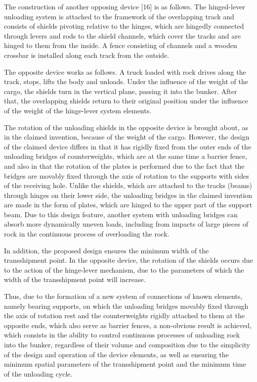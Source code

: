 \begin{multicols}{2}
The construction of another opposing device {[}16{]} is as follows. The
hinged-lever unloading system is attached to the framework of the
overlapping track and consists of shields pivoting relative to the
hinges, which are hingedly connected through levers and rods to the
shield channels, which cover the tracks and are hinged to them from the
inside. A fence consisting of channels and a wooden crossbar is
installed along each track from the outside.

The opposite device works as follows. A truck loaded with rock drives
along the track, stops, lifts the body and unloads. Under the influence
of the weight of the cargo, the shields turn in the vertical plane,
passing it into the bunker. After that, the overlapping shields return
to their original position under the influence of the weight of the
hinge-lever system elements.

The rotation of the unloading shields in the opposite device is brought
about, as in the claimed invention, because of the weight of the cargo.
However, the design of the claimed device differs in that it has rigidly
fixed from the outer ends of the unloading bridges of counterweights,
which are at the same time a barrier fence, and also in that the
rotation of the plates is performed due to the fact that the bridges are
movably fixed through the axis of rotation to the supports with sides of
the receiving hole. Unlike the shields, which are attached to the tracks
(beams) through hinges on their lower side, the unloading bridges in the
claimed invention are made in the form of plates, which are hinged to
the upper part of the support beam. Due to this design feature, another
system with unloading bridges can absorb more dynamically uneven loads,
including from impacts of large pieces of rock in the continuous process
of overloading the rock.

In addition, the proposed design ensures the minimum width of the
transshipment point. In the opposite device, the rotation of the shields
occurs due to the action of the hinge-lever mechanism, due to the
parameters of which the width of the transshipment point will increase.

Thus, due to the formation of a new system of connections of known
elements, namely bearing supports, on which the unloading bridges
movably fixed through the axis of rotation rest and the counterweights
rigidly attached to them at the opposite ends, which also serve as
barrier fences, a non-obvious result is achieved, which consists in the
ability to control continuous processes of unloading rock into the
bunker, regardless of their volume and composition due to the simplicity
of the design and operation of the device elements, as well as ensuring
the minimum spatial parameters of the transshipment point and the
minimum time of the unloading cycle.


\end{multicols}
